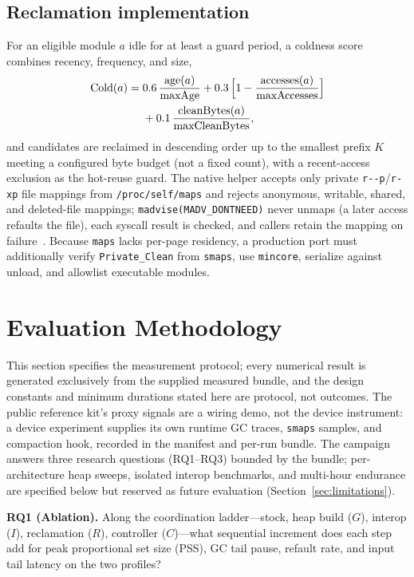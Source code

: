 \subsection{Reclamation implementation}
\label{sec:reclaim}

For an eligible module $a$ idle for at least a guard period, a coldness score
combines recency, frequency, and size,
\begin{equation}
\begin{aligned}
\mathrm{Cold}(a) = {}& 0.6\,\frac{\mathrm{age}(a)}{\mathrm{maxAge}}
  + 0.3\,\Bigl[1-\frac{\mathrm{accesses}(a)}{\mathrm{maxAccesses}}\Bigr]\\
  &+ 0.1\,\frac{\mathrm{cleanBytes}(a)}{\mathrm{maxCleanBytes}},
\end{aligned}
\end{equation}
and candidates are reclaimed in descending order up to the smallest prefix $K$
meeting a configured byte budget (not a fixed count), with a recent-access
exclusion as the hot-reuse guard. The native helper accepts only private
\texttt{r-{}-p}/\texttt{r-xp} file mappings from \texttt{/proc/self/maps} and
rejects anonymous, writable, shared, and deleted-file mappings;
\texttt{madvise(MADV\_DONTNEED)} never unmaps (a later access refaults the file),
each syscall result is checked, and callers retain the mapping on
failure~\cite{farmem2019}. Because \texttt{maps} lacks per-page residency, a
production port must additionally verify \texttt{Private\_Clean} from
\texttt{smaps}, use \texttt{mincore}, serialize against unload, and allowlist
executable modules.

\section{Evaluation Methodology}
\label{sec:method}

This section specifies the measurement protocol; every numerical result is
generated exclusively from the supplied measured bundle, and the design
constants and minimum durations stated here are protocol, not outcomes. The
public reference kit's proxy signals are a wiring demo, not the device
instrument: a device experiment supplies its own runtime GC traces,
\texttt{smaps} samples, and compaction hook, recorded in the manifest and per-run
bundle. The
campaign answers three research questions (RQ1--RQ3) bounded by the bundle;
per-architecture heap
sweeps, isolated interop benchmarks, and multi-hour endurance are specified below
but reserved as future evaluation (Section~\ref{sec:limitations}).
\par\smallskip
\noindent\textbf{RQ1 (Ablation).} Along the coordination ladder---stock, heap
build ($G$), interop ($I$), reclamation ($R$), controller ($C$)---what
sequential increment does each step add for peak proportional set size (PSS), GC
tail pause, refault
rate, and input tail latency on the two profiles?

